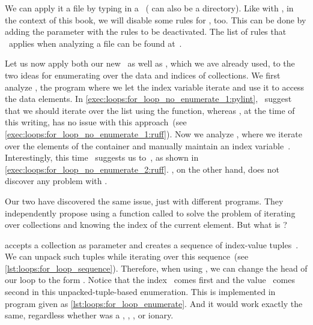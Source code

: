 We can apply it a file  by typing  in a ~( can also be a directory).
Like with \ruff, in the context of this book, we will disable some  rules for \pylint, too.
This can be done by adding the parameter  with the rules to be deactivated.
The list of rules that \pylint\ applies when analyzing a file can be found at~\cite{PC2024PL}.%
%
\begin{sloppypar}%
Let us now apply both our new  \pylint\ as well as \ruff, which we ave already used, to the two ideas for enumerating over the data and indices of collections.
We first analyze , the program where we let the index variable iterate and use it to access the data elements.
In \cref{exec:loops:for_loop_no_enumerate_1:pylint}, \pylint\ suggest that we should iterate over the list  using the  function, whereas \ruff, at the time of this writing, has no issue with this approach~(see \cref{exec:loops:for_loop_no_enumerate_1:ruff}).
Now we analyze , where we iterate over the elements of the container and manually maintain an index variable~.
Interestingly, this time \ruff\ suggests us to~, as shown in \cref{exec:loops:for_loop_no_enumerate_2:ruff}.
\pylint, on the other hand, does not discover any problem with .%
\end{sloppypar}%
%
Our two  have discovered the same issue, just with different programs.
They independently propose using a function called  to solve the problem of iterating over collections and knowing the index of the current element.
But what is ?

 accepts a collection as parameter and creates a sequence of index-value tuples~\cite{PEP279}.
We can unpack such tuples while iterating over this sequence~(see \cref{lst:loops:for_loop_sequence}).
Therefore, when using , we can change the head of our loop to the form .
Notice that the index~ comes first and the value~ comes second in this unpacked-tuple-based enumeration.
This is implemented in program  given as \cref{lst:loops:for_loop_enumerate}.
And it would work exactly the same, regardless whether  was a , , , or ionary.

